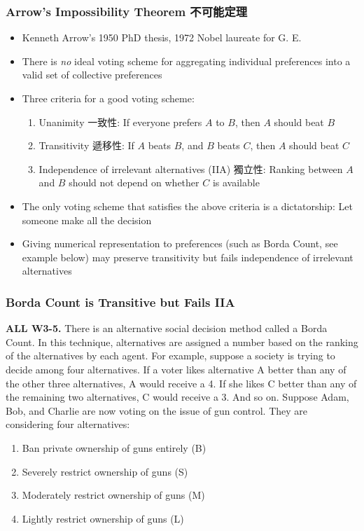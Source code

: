 \documentclass[12pt, xcolor=dvipsnames]{beamer}
\begin{document}
\begin{frame}
\frametitle{\bf Arrow's Impossibility Theorem 不可能定理}
\begin{itemize}
\item Kenneth Arrow's 1950 PhD thesis, 1972 Nobel laureate for G. E.
\item There is {\it no} ideal voting scheme for aggregating individual preferences into a valid set of collective preferences
\item Three criteria for a good voting scheme: 
\begin{enumerate}
\item Unanimity 一致性: If everyone prefers $A$ to $B$, then $A$ should beat $B$
\item Transitivity 遞移性: If $A$ beats $B$, and $B$ beats $C$, then $A$ should beat $C$
\item Independence of irrelevant alternatives (IIA) 獨立性: Ranking between $A$ and $B$ should not depend on whether $C$ is available
\end{enumerate}
\item The only voting scheme that satisfies the above criteria is a dictatorship: Let someone make all the decision
\item Giving numerical representation to preferences (such as Borda Count, see example below) may preserve transitivity but fails independence of irrelevant alternatives
\end{itemize}
\end{frame}


\begin{frame}
\frametitle{\bf Borda Count is Transitive but Fails IIA}
\small \textsf{\bfseries ALL W3-5.} There is an alternative social decision method called a Borda Count. In this technique, alternatives are assigned a number based on the ranking of the alternatives by each agent. For example, suppose a society is trying to decide among four alternatives. If a voter likes alternative A better than any of the other three alternatives, A would receive a 4. If she likes C better than any of the remaining two alternatives, C would receive a 3. And so on. Suppose Adam, Bob, and Charlie are now voting on the issue of gun control. They are considering four alternatives:
\begin{enumerate}\itemsep-0.5ex 
\item Ban private ownership of guns entirely (B)
\item Severely restrict ownership of guns (S)
\item Moderately restrict ownership of guns (M)
\item Lightly restrict ownership of guns (L)
\end{enumerate}
\end{frame}
\end{document}
